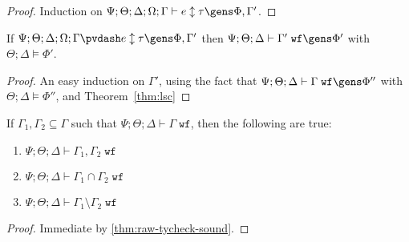 \lsc*
\begin{proof}
Induction on $\Psi ; \Theta ; \Delta ; \Omega ; \Gamma \vdash e \updownarrow \tau \gens \Phi, \Gamma'$.
\end{proof}

\begin{theorem}
If $\Psi ; \Theta ; \Delta ; \Omega ; \Gamma \pvdash e \updownarrow \tau \gens \Phi,\Gamma'$ then $\Psi ; \Theta ; \Delta \vdash \Gamma' \; \texttt{wf} \gens \Phi'$ with $\Theta ; \Delta \vDash \Phi'$.
\end{theorem}
\begin{proof}
An easy induction on $\Gamma'$, using the fact that $\Psi ; \Theta ; \Delta \vdash \Gamma \; \texttt{wf} \gens \Phi''$ with $\Theta ; \Delta \vDash \Phi''$, and Theorem~\ref{thm:lsc}
\end{proof}

\begin{theorem}
If $\Gamma_1,\Gamma_2 \subseteq \Gamma$ such that $\Psi ; \Theta ; \Delta \vdash \Gamma \; \texttt{wf}$, then the following are true:
\begin{enumerate}
  \item $\Psi ; \Theta ; \Delta \vdash \Gamma_1,\Gamma_2 \; \texttt{wf}$
  \item $\Psi ; \Theta ; \Delta \vdash \Gamma_1 \cap \Gamma_2 \; \texttt{wf}$
  \item $\Psi ; \Theta ; \Delta \vdash \Gamma_1\setminus\Gamma_2 \; \texttt{wf}$
\end{enumerate}
\end{theorem}

\label{thm:raw-tycheck-sound}


\tychecksound*
\begin{proof}
Immediate by \ref{thm:raw-tycheck-sound}.
\end{proof}

